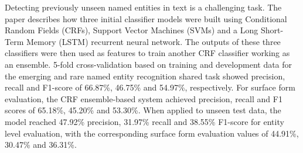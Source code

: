 Detecting previously unseen named entities in text is a challenging task. The paper describes how three initial classifier models were built using Conditional Random Fields (CRFs), Support Vector Machines (SVMs) and a Long Short-Term Memory (LSTM) recurrent neural network. The outputs of these three classifiers were then used as features to train another CRF classifier working as an ensemble. 5-fold cross-validation based on training and development data for the emerging and rare named entity recognition shared task showed precision, recall and F1-score of 66.87\%, 46.75\% and 54.97\%, respectively. For surface form evaluation, the CRF ensemble-based system achieved precision, recall and F1 scores of 65.18\%, 45.20\% and 53.30\%. When applied to unseen test data, the model reached 47.92\% precision, 31.97\% recall and 38.55\% F1-score for entity level evaluation, with the corresponding surface form evaluation values of 44.91\%, 30.47\% and 36.31\%.
